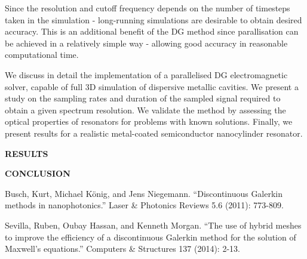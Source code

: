 \documentclass[times,11pt]{ACME2015article}
\begin{document}
\begin{normalsize}
Since the resolution and cutoff frequency depends on the number of timesteps taken in the simulation - long-running simulations are desirable to obtain desired accuracy. This is an additional benefit of the DG method since parallisation can be achieved in a relatively simple way - allowing good accuracy in reasonable computational time.

We discuss in detail the implementation of a parallelised DG electromagnetic solver, capable of full 3D simulation of dispersive metallic cavities. We present a study on the sampling rates and duration of the sampled signal required to obtain a given spectrum resolution. We validate the method by assessing the optical properties of resonators for problems with known solutions. Finally, we present results for a realistic metal-coated semiconductor nanocylinder resonator.

\begin{center}
\textbf{RESULTS}\\[1mm]
\end{center}

\begin{center}
\textbf{CONCLUSION}\\[1mm]
\end{center}

\end{normalsize}


\begin{thebibliography}{99}
Busch, Kurt, Michael König, and Jens Niegemann. ``Discontinuous Galerkin methods in nanophotonics.'' Laser \& Photonics Reviews 5.6 (2011): 773-809.

Sevilla, Ruben, Oubay Hassan, and Kenneth Morgan. ``The use of hybrid meshes to improve the efficiency of a discontinuous Galerkin method for the solution of Maxwell’s equations.'' Computers \& Structures 137 (2014): 2-13.

\end{thebibliography}
\end{document}
